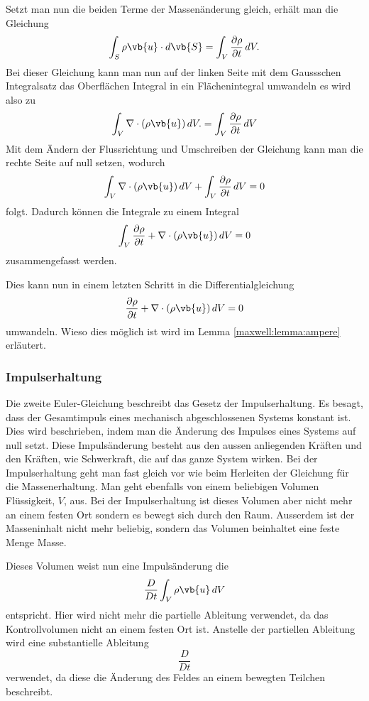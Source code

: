 Setzt man nun die beiden Terme der Massenänderung gleich, erhält man die Gleichung 
\[\int_{S}\rho\vb{u}\cdot d\vb{S} 
=
\int_{V} \frac{\partial \rho}{\partial t} \, dV .\] 
Bei dieser Gleichung kann man nun auf der linken Seite mit dem Gaussschen Integralsatz das Oberflächen Integral in ein Flächenintegral umwandeln es wird also zu
\[\int_{V}\nabla\cdot(\rho\vb{u}) \, dV.
=
\int_{V}\frac{\partial \rho}{\partial t}  \, dV \]
Mit dem Ändern der Flussrichtung und Umschreiben der Gleichung kann man die rechte Seite auf null setzen, wodurch 
\[\int_{V}\nabla\cdot(\rho\vb{u})  \, dV + \int_{V}\frac{\partial \rho}{\partial t}  \, dV 
= 
0\] 
folgt.
Dadurch können die Integrale zu einem Integral
\[\int_{V} \frac{\partial \rho}{\partial t} + \nabla\cdot(\rho\vb{u})  \, dV 
= 
0\]
zusammengefasst werden.

Dies kann nun in einem letzten Schritt in die Differentialgleichung
\begin{equation}
\label{openfoam:euler1}
\frac{\partial \rho}{\partial t} + \nabla\cdot(\rho\vb{u})  \, dV 
= 
0
\end{equation}
umwandeln.
Wieso dies möglich ist wird im Lemma \ref{maxwell:lemma:ampere} erläutert.

\subsubsection{Impulserhaltung}
Die zweite Euler-Gleichung beschreibt das Gesetz der Impulserhaltung. 
Es besagt, dass der Gesamtimpuls eines mechanisch abgeschlossenen Systems konstant ist.
Dies wird beschrieben, indem man die Änderung des Impulses eines Systems auf null setzt.
Diese Impulsänderung besteht aus den aussen anliegenden Kräften und den Kräften, wie Schwerkraft, die auf das ganze System wirken.
Bei der Impulserhaltung geht man fast gleich vor wie beim Herleiten der Gleichung für die Massenerhaltung.
Man geht ebenfalls von einem beliebigen Volumen Flüssigkeit, $V$, aus.
Bei der Impulserhaltung ist dieses Volumen aber nicht mehr an einem festen Ort sondern es bewegt sich durch den Raum.
Ausserdem ist der Masseninhalt nicht mehr beliebig, sondern das Volumen beinhaltet eine feste Menge Masse.

Dieses Volumen weist nun eine Impulsänderung die
\[\frac{D}{Dt}\int_{V}\rho\vb{u}\, dV\]
entspricht.
Hier wird nicht mehr die partielle Ableitung verwendet, da das Kontrollvolumen nicht an einem festen Ort ist.
Anstelle der partiellen Ableitung wird eine substantielle Ableitung \[\frac{D}{Dt}\] verwendet, da diese die Änderung des Feldes an einem bewegten Teilchen beschreibt.

